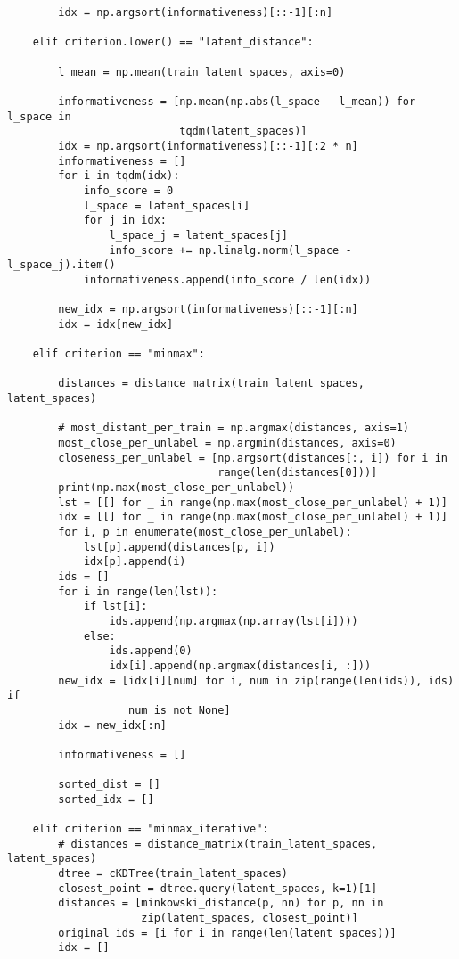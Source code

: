 \begin{lstlisting}
        idx = np.argsort(informativeness)[::-1][:n]

    elif criterion.lower() == "latent_distance":

        l_mean = np.mean(train_latent_spaces, axis=0)

        informativeness = [np.mean(np.abs(l_space - l_mean)) for l_space in
                           tqdm(latent_spaces)]
        idx = np.argsort(informativeness)[::-1][:2 * n]
        informativeness = []
        for i in tqdm(idx):
            info_score = 0
            l_space = latent_spaces[i]
            for j in idx:
                l_space_j = latent_spaces[j]
                info_score += np.linalg.norm(l_space - l_space_j).item()
            informativeness.append(info_score / len(idx))

        new_idx = np.argsort(informativeness)[::-1][:n]
        idx = idx[new_idx]

    elif criterion == "minmax":

        distances = distance_matrix(train_latent_spaces, latent_spaces)

        # most_distant_per_train = np.argmax(distances, axis=1)
        most_close_per_unlabel = np.argmin(distances, axis=0)
        closeness_per_unlabel = [np.argsort(distances[:, i]) for i in
                                 range(len(distances[0]))]
        print(np.max(most_close_per_unlabel))
        lst = [[] for _ in range(np.max(most_close_per_unlabel) + 1)]
        idx = [[] for _ in range(np.max(most_close_per_unlabel) + 1)]
        for i, p in enumerate(most_close_per_unlabel):
            lst[p].append(distances[p, i])
            idx[p].append(i)
        ids = []
        for i in range(len(lst)):
            if lst[i]:
                ids.append(np.argmax(np.array(lst[i])))
            else:
                ids.append(0)
                idx[i].append(np.argmax(distances[i, :]))
        new_idx = [idx[i][num] for i, num in zip(range(len(ids)), ids) if
                   num is not None]
        idx = new_idx[:n]

        informativeness = []

        sorted_dist = []
        sorted_idx = []

    elif criterion == "minmax_iterative":
        # distances = distance_matrix(train_latent_spaces, latent_spaces)
        dtree = cKDTree(train_latent_spaces)
        closest_point = dtree.query(latent_spaces, k=1)[1]
        distances = [minkowski_distance(p, nn) for p, nn in
                     zip(latent_spaces, closest_point)]
        original_ids = [i for i in range(len(latent_spaces))]
        idx = []


\end{lstlisting}
